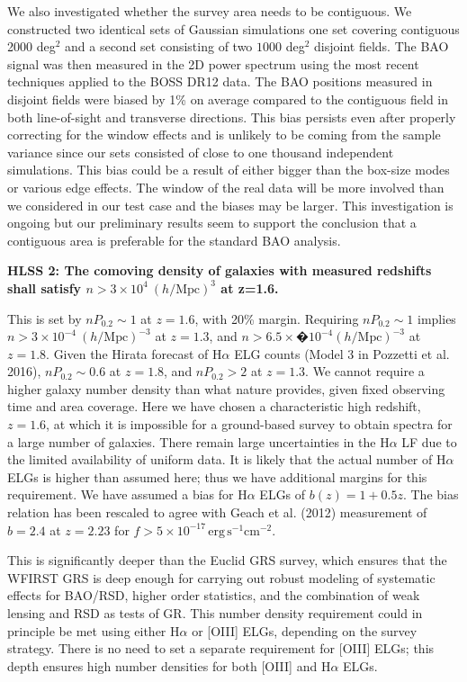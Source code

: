  We also investigated whether the survey area needs to be contiguous. We
 constructed two identical sets of Gaussian simulations one set covering
 contiguous 2000 deg$^2$ and a second set consisting of two $1000$ deg$^2$
 disjoint fields. The BAO signal was then measured in the 2D power spectrum using the
 most recent techniques applied to the BOSS DR12 data. The BAO positions measured
 in disjoint fields were biased by 1\% on average compared to the contiguous
 field in both line-of-sight and transverse directions. This bias persists even
 after properly correcting for the window effects and is unlikely to be coming
 from the sample variance since our sets consisted of close to one thousand
 independent simulations. This bias could be a result of either bigger than the
 box-size modes or various edge effects. The window of the real data will be more
 involved than we considered in our test case and the biases may be larger. This
 investigation is ongoing but our preliminary results seem to support the
 conclusion that a contiguous area is preferable for the standard BAO analysis.

  \noindent
 {\bf HLSS 2: The comoving density of galaxies with measured redshifts shall satisfy $n
 > 3\times10^{4}\ (h/\textrm{Mpc})^3$ at z=1.6. }

 This is set by $nP_{0.2} \sim1$ at $z=1.6$, with 20\% margin. Requiring $nP_{0.2}
 \sim1$ implies $n> 3\times10^{-4}\ (h/\mathrm{Mpc})^{-3}$ at $z=1.3$, and $n >
 6.5\times �10^{-4} (h/\mathrm{Mpc})^{-3}$ at $z=1.8$. Given the Hirata
 forecast of H$\alpha$ ELG counts (Model 3 in Pozzetti et al. 2016), $nP_{0.2}\sim0.6$ at $z=1.8$,
 and $nP_{0.2}>2$ at $z=1.3$.  We cannot require a higher galaxy number density than
 what nature provides, given fixed observing time and area coverage. Here we have
 chosen a characteristic high redshift, $z=1.6$, at which it is impossible for a
 ground-based survey to obtain spectra for a large number of galaxies. There
 remain large uncertainties in the H$\alpha$ LF due to the limited availability of
 uniform data. It is likely that the actual number of H$\alpha$ ELGs is higher than
 assumed here; thus we have additional margins for this requirement. We have
 assumed a bias for H$\alpha$ ELGs of $b(z) = 1+0.5z$. The bias relation has been rescaled
 to agree with Geach et al. (2012) measurement of $b=2.4$ at $z=2.23$ for $f >
 5\times 10^{-17} \, \mathrm{ erg\,s^{-1}cm^{-2}}$.

 This is significantly deeper than the Euclid GRS survey, which ensures that the
 WFIRST GRS is deep enough for carrying out robust modeling of systematic effects
 for BAO/RSD, higher order statistics, and the combination of weak lensing and
 RSD as tests of GR. This number density requirement could in principle be met
 using either H$\alpha$ or [OIII] ELGs, depending on the survey strategy. There is no
 need to set a separate requirement for [OIII] ELGs; this depth ensures high
 number densities for both [OIII] and H$\alpha$ ELGs.

